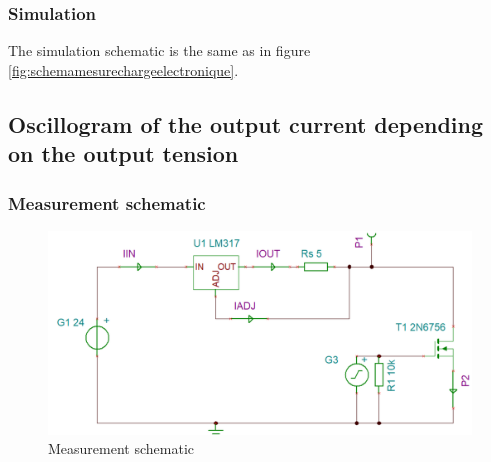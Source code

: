 {\subsubsection{Simulation}

The simulation schematic is the same as in figure \ref{fig:schemamesurechargeelectronique}.



}

\newpage
\subsection{Oscillogram of the output current depending on the output tension} \label{ssec:num13}
{
	\subsubsection{Measurement schematic}
	\begin{figure}[h]
		\centering
		\includegraphics[width=0.8\linewidth]{../../schemaMesurePulses}
		\caption{Measurement schematic}
		\label{fig:schemamesurepulses}
	\end{figure}
}

\clearpage

